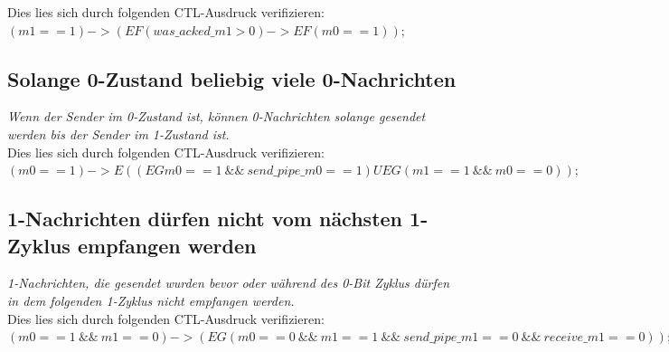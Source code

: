 \documentclass[]{scrartcl}
\begin{document}
Dies lies sich durch folgenden CTL-Ausdruck verifizieren: \\

$(m1 == 1) -> (EF (was\_acked\_m1 > 0) -> EF (m0 == 1));$

\subsection{Solange 0-Zustand beliebig viele 0-Nachrichten}

\textit{Wenn der Sender im 0-Zustand ist, können 0-Nachrichten solange gesendet werden bis der
Sender im 1-Zustand ist.}\\

Dies lies sich durch folgenden CTL-Ausdruck verifizieren: \\

$(m0 == 1) -> E((EG m0 == 1\ \&\&\ send\_pipe\_m0 == 1)  U EG (m1 == 1\ \&\&\ m0 == 0));$

\subsection{1-Nachrichten dürfen nicht vom nächsten 1-Zyklus empfangen werden}

\textit{1-Nachrichten, die gesendet wurden bevor oder während des 0-Bit Zyklus dürfen in dem
folgenden 1-Zyklus nicht empfangen werden.}\\

Dies lies sich durch folgenden CTL-Ausdruck verifizieren: \\

$(m0 == 1\ \&\&\ m1 == 0) -> (EG (m0 == 0\ \&\&\ m1 == 1\ \&\&\ send\_pipe\_m1 == 0\ \&\&\ receive\_m1 == 0));$
\end{document}
